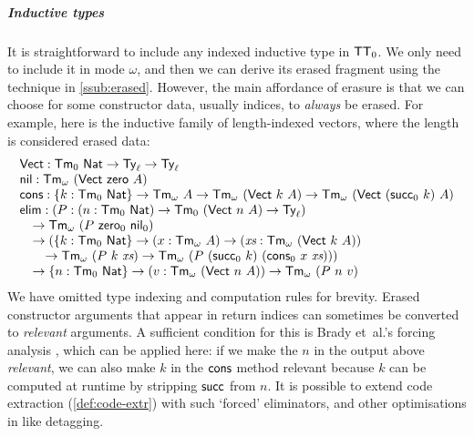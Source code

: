 \documentclass[10pt,a4paper]{article}
\theoremstyle{definition}
\theoremstyle{remark}
\newcommand{\s}[1]{{\ensuremath{\textsf{\upshape #1}}}\xspace}
\newcommand{\Ty}{\s{Ty}}
\newcommand{\Tm}{\s{Tm}}
\newcommand{\ZTT}{\ensuremath{\s{TT}_0}\xspace}
\begin{document}
\subparagraph{Inductive types}\label{ssub:inductive}

It is straightforward to include any indexed inductive type in \ZTT. We only
need to include it in mode $\omega$, and then we can derive its erased fragment
using the technique in \cref{ssub:erased}. However, the main affordance of
erasure is that we can choose for some constructor data, usually indices, to
\emph{always} be erased. For example, here is the inductive family of
length-indexed vectors, where the length is considered erased data:
\[
\begin{array}{l}
  \s{Vect} : \s{Tm}_0\ {\s{Nat}} \to \Ty_\ell \to \Ty_\ell \\
  \s{nil} : \Tm_\omega\ (\s{Vect}\ \s{zero}\ A) \\
  \s{cons} : \{k : \Tm_0\ \s{Nat}\} \to \Tm_\omega\ A \to
    \Tm_\omega\ (\s{Vect}\ k\ A) \to \Tm_\omega\ (\s{Vect}\ (\s{succ}_0\ k)\ A) \\
  \s{elim} : (P : (n : \Tm_0\ \s{Nat}) \to \Tm_0\ (\s{Vect}\ n\ A) \to \Ty_\ell) \\
  \quad \to \Tm_\omega\ (P\ \s{zero}_0\ \s{nil}_0) \\
  \quad \to (\{k : \Tm_0\ \s{Nat}\} \to (x : \Tm_\omega\ A)
  \to (\textit{xs} : \Tm_\omega\ (\s{Vect}\ k\ A))  \\
  \quad \quad \to \Tm_\omega\ (P\ k\ \textit{xs})
  \to \Tm_\omega\ (P\ (\s{succ}_0\ k)\ (\s{cons}_0\ x\ \textit{xs}))) \\
  \quad
  \to
  \{n : \Tm_0\ \s{Nat}\} \to
  (v : \Tm_\omega\ (\s{Vect}\ n\ A))
  \to \Tm_\omega\ (P\ n\ v) \\
\end{array}\]
We have omitted type indexing and computation rules for brevity. Erased constructor
arguments that appear in return indices can sometimes be converted to
\emph{relevant} arguments. A sufficient condition for this is Brady et~al.'s
forcing analysis \cite{Brady2004-ay}, which can be applied here: if we make the
$n$ in the output above \emph{relevant}, we can also make $k$ in the $\s{cons}$
method relevant because $k$ can be computed at runtime by stripping $\s{succ}$
from $n$. It is possible to extend code extraction (\cref{def:code-extr}) with such
`forced' eliminators, and other optimisations in \cite{Brady2004-ay} like
detagging.
\end{document}
